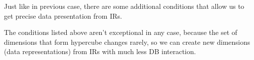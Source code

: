 \documentclass[10pt,journal,cspaper,compsoc]{IEEEtran}
\begin{document}


Just like in previous case, there are some additional conditions that allow us
to get precise data presentation from IRs.



The conditions listed above aren't exceptional in any case, because the set of
dimensions that form hypercube changes rarely, so we can create new dimensions
(data representations) from IRs with much less DB interaction.

%
%



%
%
\end{document}
